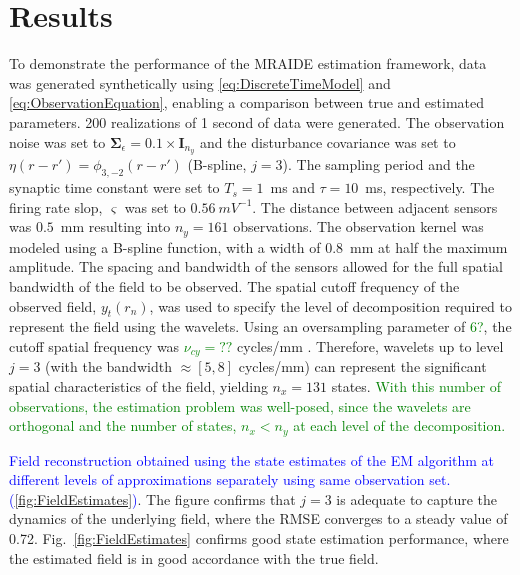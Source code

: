 \documentclass[journal]{IEEEtran}
\newcommand{\dean}[1]{\textcolor{green}{#1}}
\newcommand{\parham}[1]{\textcolor{blue}{#1}}
\newcommand{\cut}[1]{\textcolor{cyan}{#1}}
\begin{document}
\section{Results}
To demonstrate the performance of the MRAIDE estimation framework, data was generated synthetically  using \eqref{eq:DiscreteTimeModel} and \eqref{eq:ObservationEquation}, enabling a comparison between true and estimated parameters. 200 realizations of 1 second of data were generated. The observation noise was set to $\boldsymbol\Sigma_{\epsilon}=0.1 \times \mathbf{I}_{n_y}$ and the disturbance covariance was set to $\eta(r-r') = \phi_{3,-2}(r-r')$ (B-spline, $j=3$). The sampling period and the synaptic time constant were set to $T_s = 1$~ms and $\tau = 10$~ms, respectively. The firing rate slop, $\varsigma$ was set to $0.56  ~mV^{-1}$. The distance between adjacent sensors was $0.5$~mm resulting into $n_y = 161$ observations. The observation kernel was modeled using a B-spline function, with a width of 0.8~mm at half the maximum amplitude. The spacing and bandwidth of the sensors allowed for the full spatial bandwidth of the field to be observed. The spatial cutoff frequency of the observed field, $y_t(r_n)$, was used to specify the level of decomposition required to represent the field using the wavelets. Using an oversampling parameter of \dean{6?}, the cutoff spatial frequency was \dean{$\nu_{cy} = ??$} cycles/mm \cite{Freestone2011}. Therefore, wavelets up to level $j=3$ (with the bandwidth $\approx[5,8]$ cycles/mm) can represent the significant spatial characteristics of the field, yielding $n_x = 131$ states. \dean{With this number of observations, the estimation problem was well-posed, since the wavelets are orthogonal and the number of states, $n_x < n_y$ at each level of the decomposition.}  

\parham{Field reconstruction obtained using the state estimates of the EM algorithm at different levels of approximations separately using same observation set. (\figurename{\ref{fig:FieldEstimates}})}. The figure confirms that $j=3$ is adequate to capture the dynamics of the underlying field, where the RMSE converges to a steady value of 0.72. Fig.~\ref{fig:FieldEstimates} confirms good state estimation performance, where the estimated field is in good accordance with the true field. 
\end{document}
